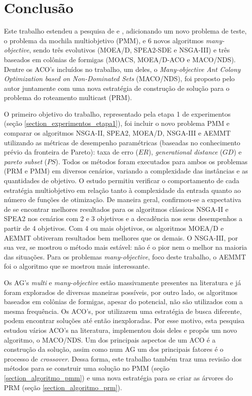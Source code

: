 \chapter[Conclusão]{Conclusão}
Este trabalho estendeu a pesquisa de \cite{Bueno2010} e \cite{Lafeta2016}, adicionando um novo problema de teste, o problema da mochila multiobjetivo (PMM), e 6 novos algoritmos \textit{many-objective}, sendo três evolutivos (MOEA/D, SPEA2-SDE e NSGA-III) e três baseados em colônias de formigas (MOACS, MOEA/D-ACO e MACO/NDS). Dentre os ACO's incluídos no trabalho, um deles, o \textit{Many-objective Ant Colony Optimization based on Non-Dominated Sets} (MACO/NDS), foi proposto pelo autor juntamente com uma nova estratégia de construção de solução para o problema do roteamento multicast (PRM).

O primeiro objetivo do trabalho, representado pela etapa 1 de experimentos (seção \ref{section_experimentos_etapa1}), foi incluir o novo problema PMM e comparar os algoritmos NSGA-II, SPEA2, MOEA/D, NSGA-III e AEMMT utilizando as métricas de desempenho paramétricas (baseadas no conhecimento prévio da fronteira de Pareto): taxa de erro ($ER$), \textit{generational distance} ($GD$) e \textit{pareto subset} ($PS$). Todos os métodos foram executados para ambos os problemas (PRM e PMM) em diversos cenários, variando a complexidade das instâncias e as quantidades de objetivo. O estudo permitiu verificar o comportamento de cada estratégia multiobjetivo em relação tanto à complexidade da entrada quanto ao número de funções de otimização. De maneira geral, confirmou-se a expectativa de se encontrar melhores resultados para os algoritmos clássicos NSGA-II e SPEA2 nos cenários com 2 e 3 objetivos e a decadência nos seus desempenhos a partir de 4 objetivos. Com 4 ou mais objetivos, os algoritmos MOEA/D e AEMMT obtiveram resultados bem melhores que os demais. O NSGA-III, por sua vez, se mostrou o método mais estável: não é o pior nem o melhor na maioria das situações. Para os problemas \textit{many-objective}, foco deste trabalho, o AEMMT foi o algoritmo que se mostrou mais interessante.

Os AG's \textit{multi} e \textit{many-objective} estão massivamente presentes na literatura e já foram explorados de diversas maneiras possíveis, por outro lado, os algoritmos baseados em colônias de formigas, apesar do potencial, não são utilizados com a mesma frequência. Os ACO's, por utilizarem uma estratégia de busca diferente, podem encontrar soluções até então inexploradas. Por esse motivo, esta pesquisa estudou vários ACO's na literatura, implementou dois deles e propôs um novo algoritmo, o MACO/NDS. Um dos principais aspectos de um ACO é a construção da solução, assim como num AG um dos principais fatores é o processo de \textit{crossover}. Dessa forma, este trabalho também traz uma revisão dos métodos para se construir uma solução no PMM (seção \ref{section_algoritmo_pmm}) e uma nova estratégia para se criar as árvores do PRM (seção \ref{section_algoritmo_prm}).

